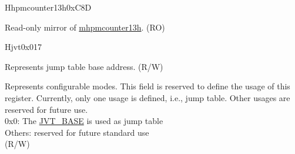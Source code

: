 \begin{register}{H}{hpmcounter13h}{0xC8D}\label{regdesc:HPMCOUNTER13H}
%
\regnewline%
\begin{regdesc}\begin{reglist}
\label{fielddesc:HPMCOUNTER13H}\item [HPMCOUNTER13H] Read-only mirror of \hyperref[regdesc:MHPMCOUNTER13H]{mhpmcounter13h}.  (RO)
\end{reglist}\end{regdesc}
\end{register}




\begin{register}{H}{jvt}{0x017}\label{regdesc:JVT}%
%
%
\regnewline%
\begin{regdesc}\begin{reglist}
\label{fielddesc:JVT_BASE}\item [BASE] Represents jump table base address. (R/W)
\label{fielddesc:JVT_MODE}\item [MODE] Represents configurable modes. This field is reserved to define the usage of this register. Currently, only one usage is defined, i.e., jump table. Other usages are reserved for future use.\\
0x0: The \hyperref[fielddesc:JVT_BASE]{JVT\_BASE} is used as jump table \\
Others: reserved for future standard use \\
(R/W)
\end{reglist}\end{regdesc}
\end{register}

